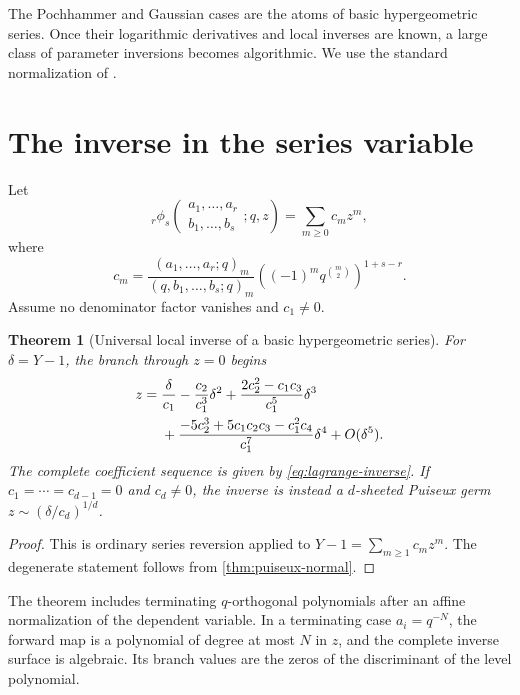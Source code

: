 \documentclass[11pt,a4paper,oneside,openany]{book}
\newtheorem{theorem}{Theorem}[chapter]
\theoremstyle{definition}
\theoremstyle{remark}
\begin{document}
The Pochhammer and Gaussian cases are the atoms of basic hypergeometric
series.  Once their logarithmic derivatives and local inverses are known, a
large class of parameter inversions becomes algorithmic.  We use the standard
normalization of \cite{GasperRahman,AndrewsAskeyRoy}.

\section{The inverse in the series variable}

Let
\begin{equation}\label{eq:rphis-definition}
 {}_r\phi_s\!\left(
 \begin{matrix}a_1,\ldots,a_r\\ b_1,\ldots,b_s\end{matrix};q,z\right)
 =\sum_{m\ge0}c_m z^m,
\end{equation}
where
\begin{equation}\label{eq:rphis-coefficients}
 c_m=
 \frac{(a_1,\ldots,a_r;q)_m}
      {(q,b_1,\ldots,b_s;q)_m}
 \left((-1)^m q^{\binom m2}\right)^{1+s-r}.
\end{equation}
Assume no denominator factor vanishes and \(c_1\ne0\).

\begin{theorem}[Universal local inverse of a basic hypergeometric series]
\label{thm:rphis-z-inverse}
For \(\delta=Y-1\), the branch through \(z=0\) begins
\begin{align}
 z={}&\frac{\delta}{c_1}
 -\frac{c_2}{c_1^3}\delta^2
 +\frac{2c_2^2-c_1c_3}{c_1^5}\delta^3 \notag\\
 &+\frac{-5c_2^3+5c_1c_2c_3-c_1^2c_4}{c_1^7}\delta^4
 +O(\delta^5).
 \label{eq:rphis-z-inverse}
\end{align}
The complete coefficient sequence is given by \eqref{eq:lagrange-inverse}.
If \(c_1=\cdots=c_{d-1}=0\) and \(c_d\ne0\), the inverse is instead a
\(d\)-sheeted Puiseux germ \(z\sim(\delta/c_d)^{1/d}\).
\end{theorem}

\begin{proof}
This is ordinary series reversion applied to \(Y-1=\sum_{m\ge1}c_mz^m\).
The degenerate statement follows from \cref{thm:puiseux-normal}.
\end{proof}

The theorem includes terminating \(q\)-orthogonal polynomials after an
affine normalization of the dependent variable.  In a terminating case
\(a_i=q^{-N}\), the forward map is a polynomial of degree at most \(N\) in
\(z\), and the complete inverse surface is algebraic.  Its branch values are
the zeros of the discriminant of the level polynomial.
\end{document}
